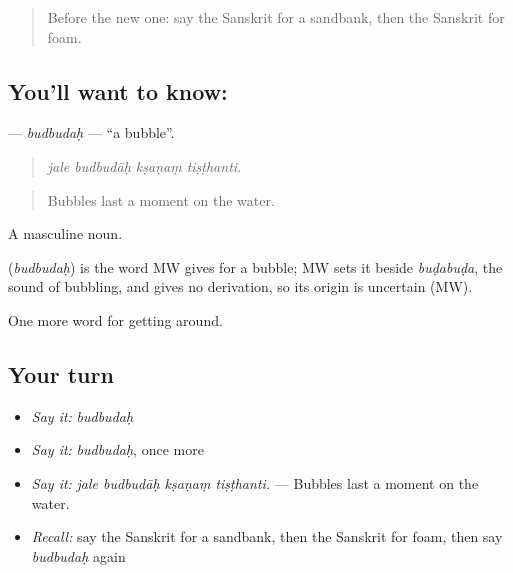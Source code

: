 \label{lesson:SA-C417-budbudah}



\begin{quote}
Before the new one: say the Sanskrit for a sandbank, then the Sanskrit for foam.
\end{quote}

\subsection*{You'll want to know: }
\textbf{} — \emph{budbudaḥ} — \textquotedblleft{}a bubble\textquotedblright{}.

\begin{quote}
   
\end{quote}

\begin{quote}
\emph{jale budbudāḥ kṣaṇaṃ tiṣṭhanti.}
\end{quote}

\begin{quote}
Bubbles last a moment on the water.
\end{quote}

A masculine noun.

\begin{cousinweb}
\textbf{} (\emph{budbudaḥ}) is the word MW gives for a bubble; MW sets it beside \emph{buḍabuḍa}, the sound of bubbling, and gives no derivation, so its origin is uncertain (MW).
\end{cousinweb}

\begin{grammarlens}[title={What you've built}]
One more word for getting around.
\end{grammarlens}

\subsection*{Your turn}
\begin{itemize}
\raggedright
  \item \emph{Say it:} \emph{budbudaḥ}
  \item \emph{Say it:} \emph{budbudaḥ}, once more
  \item \emph{Say it:} \emph{jale budbudāḥ kṣaṇaṃ tiṣṭhanti.} — Bubbles last a moment on the water.
  \item \emph{Recall:} say the Sanskrit for a sandbank, then the Sanskrit for foam, then say \emph{budbudaḥ} again
\end{itemize}

